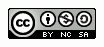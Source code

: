 \documentclass[]{scrartcl}
\begin{document}
\begin{figure}[b]
\begin{center}
\includegraphics[scale=0.6]{figures/88x31.png}
\label{default}
\end{center}
\end{figure}
\end{document}

